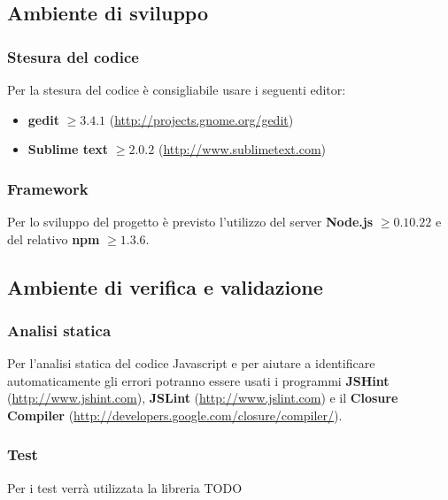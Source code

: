 	\subsection{Ambiente di sviluppo}
		
		\subsubsection{Stesura del codice}
		
		Per la stesura del codice è consigliabile usare i seguenti editor:
		\begin{itemize}
			\item \textbf{gedit} $\geq 3.4.1$ (\url{http://projects.gnome.org/gedit})
			\item \textbf{Sublime text} $\geq 2.0.2$ (\url{http://www.sublimetext.com})
		\end{itemize}
		
		\subsubsection{Framework}
		
		Per lo sviluppo del progetto è previsto l'utilizzo del server \textbf{Node.js} $\geq 0.10.22$ e del relativo  \textbf{npm} $\geq 1.3.6$.
		


	\subsection{Ambiente di verifica e validazione}
		\subsubsection{Analisi statica}
		
		Per l'analisi statica del codice Javascript e per aiutare a identificare automaticamente gli errori potranno essere usati i programmi \textbf{JSHint} (\url{http://www.jshint.com}), \textbf{JSLint} (\url{http://www.jslint.com}) e il \textbf{Closure Compiler} (\url{http://developers.google.com/closure/compiler/}).
		
		
		\subsubsection{Test}
		
		Per i test verrà utilizzata la libreria TODO
		
		
